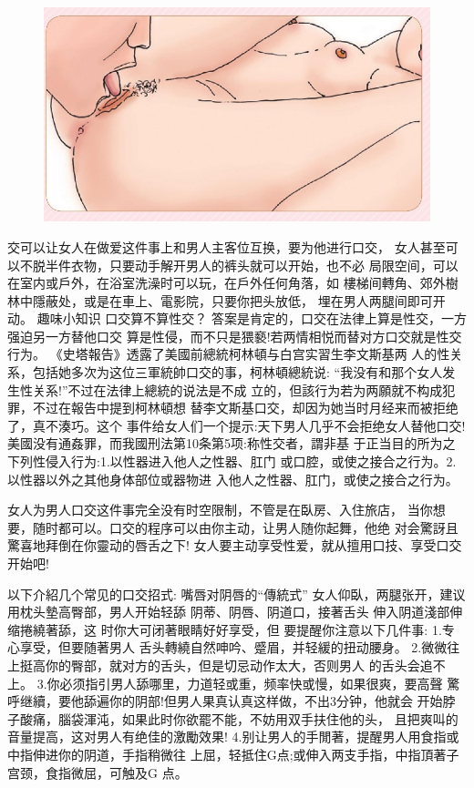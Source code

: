 \documentclass[12pt,UTF8]{ctexbook}
\begin{document}
\begin{figure}[htbp]
	\centering
	\includegraphics[width=0.7\linewidth]{19}
	\caption{}
	\label{fig:1}
\end{figure}

交可以让女人在做爱这件事上和男人主客位互换，要为他进行口交，
女人甚至可以不脱半件衣物，只要动手解开男人的裤头就可以开始，也不必
局限空间，可以在室内或戶外，在浴室洗澡时可以玩，在戶外任何角落，如
樓梯间轉角、郊外樹林中隱蔽处，或是在車上、電影院，只要你把头放低，
埋在男人两腿间即可开动。
趣味小知识
口交算不算性交？
答案是肯定的，口交在法律上算是性交，一方强迫另一方替他口交
算是性侵，而不只是猥褻!若两情相悦而替对方口交就是性交行为。
《史塔報告》透露了美國前總統柯林頓与白宫实習生李文斯基两
人的性关系，包括她多次为这位三軍統帥口交的事，柯林頓總統说:
“我没有和那个女人发生性关系!”不过在法律上總統的说法是不成
立的，但該行为若为两願就不构成犯罪，不过在報告中提到柯林頓想
替李文斯基口交，却因为她当时月经来而被拒绝了，真不湊巧。这个
事件给女人们一个提示:天下男人几乎不会拒绝女人替他口交!
美國没有通姦罪，而我國刑法第10条第5项:称性交者，謂非基
于正当目的所为之下列性侵入行为:1.以性器进入他人之性器、肛门
或口腔，或使之接合之行为。2.以性器以外之其他身体部位或器物进
入他人之性器、肛门，或使之接合之行为。

女人为男人口交这件事完全没有时空限制，不管是在臥房、入住旅店，
当你想要，随时都可以。口交的程序可以由你主动，让男人随你起舞，他绝
对会驚訝且驚喜地拜倒在你靈动的唇舌之下!
女人要主动享受性爱，就从擅用口技、享受口交开始吧!

以下介紹几个常见的口交招式:
嘴唇对阴唇的“傳統式”
女人仰臥，两腿张开，建议
用枕头墊高臀部，男人开始轻舔
阴蒂、阴唇、阴道口，接著舌头
伸入阴道淺部伸缩捲繞著舔，这
时你大可闭著眼睛好好享受，但
要提醒你注意以下几件事:
1.专心享受，但要随著男人
舌头轉繞自然呻吟、蹙眉，并轻緩的扭动腰身。
2.微微往上挺高你的臀部，就对方的舌头，但是切忌动作太大，否则男人
的舌头会追不上。
3.你必须指引男人舔哪里，力道轻或重，频率快或慢，如果很爽，要高聲
驚呼继續，要他舔遍你的阴部!但男人果真认真这样做，不出3分钟，他就会
开始脖子酸痛，腦袋渾沌，如果此时你欲罷不能，不妨用双手扶住他的头，
且把爽叫的音量提高，这对男人有绝佳的激勵效果!
4.别让男人的手閒著，提醒男人用食指或中指伸进你的阴道，手指稍微往
上屈，轻抵住G点;或伸入两支手指，中指頂著子宫颈，食指微屈，可触及G
点。
\end{document}

